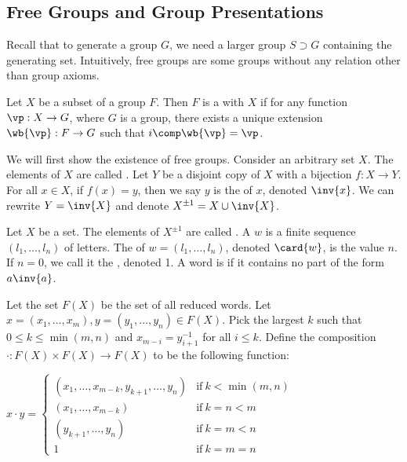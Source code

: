 \documentclass[10pt]{article}
\begin{document}
\subsection{Free Groups and Group Presentations}
\par
Recall that to generate a group $G$, we need a larger group $S\supset G$ containing the generating set. Intuitively, free groups are some groups without any relation other than group axioms.
\begin{adefinition}
    Let $X$ be a subset of a group $F$. Then $F$ is a  with  $X$ if for any function $\vp:X\to G$, where $G$ is a group, there exists a unique extension $\wb{\vp}:F\to G$ such that $i\comp\wb{\vp}=\vp$.
\end{adefinition}
\begin{center}
\end{center}
\par
We will first show the existence of free groups. Consider an arbitrary set $X$. The elements of $X$ are called . Let $Y$ be a disjoint copy of $X$ with a bijection $f:X\to Y$. For all $x\in X$, if $f(x)=y$, then we say $y$ is the  of $x$, denoted $\inv{x}$. We can rewrite $Y=\inv{X}$ and denote ${X}^{\pm 1}=X\cup\inv{X}$.
\begin{adefinition}
    Let $X$ be a set. The elements of ${X}^{\pm 1}$ are called . A  $w$ is a finite sequence $({l}_{1},\dots,{l}_{n})$ of letters. The  of $w=({l}_{1},\dots,{l}_{n})$, denoted $\card{w}$, is the value $n$. If $n=0$, we call it the , denoted 1. A word is  if it contains no part of the form $a\inv{a}$.
\end{adefinition}
\par
Let the set $F(X)$ be the set of all reduced words. Let $x=({x}_{1},\dots,{x}_{m}),y=({y}_{1},\dots,{y}_{n})\in F(X)$. Pick the largest $k$ such that $0\le k\le\min(m,n)$ and ${x}_{m-i}={y}_{i+1}^{-1}$ for all $i\le k$. Define the composition $\cdot:F(X)\times F(X)\to F(X)$ to be the following function:
\begin{center}
    $x\cdot y=\begin{cases}
        ({x}_{1},\dots,{x}_{m-k},{y}_{k+1},\dots,{y}_{n}) & \text{if}\ k<\min(m,n) \\
        ({x}_{1},\dots,{x}_{m-k}) & \text{if}\ k=n<m \\
        ({y}_{k+1},\dots,{y}_{n}) & \text{if}\ k=m<n \\
        1 & \text{if}\ k=m=n
    \end{cases}$
\end{center}
\end{document}
